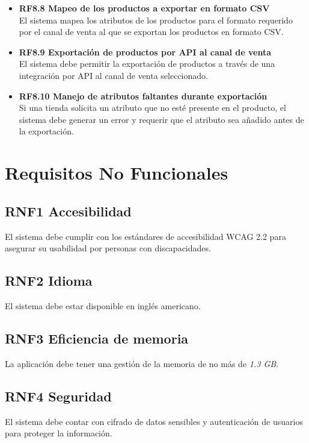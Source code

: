 \documentclass[12pt.a4paper]{article}
\begin{document}
\begin{itemize}
    \item \textbf{RF8.8 Mapeo de los productos a exportar en formato CSV} \\
    El sistema mapea los atributos de los productos para el formato requerido por el canal de venta al que se exportan los productos en formato CSV.

    \item \textbf{RF8.9 Exportación de productos por API al canal de venta} \\
    El sistema debe permitir la exportación de productos a través de una integración por API al canal de venta seleccionado.

    \item \textbf{RF8.10 Manejo de atributos faltantes durante exportación} \\
    Si una tienda solicita un atributo que no esté presente en el producto, el sistema debe generar un error y requerir que el atributo sea añadido antes de la exportación.
\end{itemize}

\section{Requisitos No Funcionales}
\subsection*{RNF1 Accesibilidad}
El sistema debe cumplir con los estándares de accesibilidad WCAG 2.2 para asegurar su usabilidad por personas con discapacidades.

\subsection*{RNF2 Idioma}
El sistema debe estar disponible en inglés americano.

\subsection*{RNF3 Eficiencia de memoria}
La aplicación debe tener una gestión de la memoria de no más de \textit{1.3 GB}.

\subsection*{RNF4 Seguridad}
El sistema debe contar con cifrado de datos sensibles y autenticación de usuarios para proteger la información.
\end{document}
